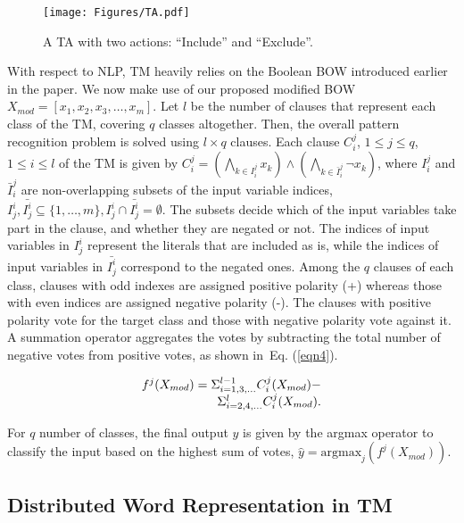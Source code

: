 \documentclass[11pt]{article}
\begin{document}
\begin{figure}[h]
    \centering
    \texttt{[image: Figures/TA.pdf]}
    \caption{A TA with two actions: ``Include'' and ``Exclude''.}
    \label{fig4}
\end{figure}


\par With respect to NLP, TM heavily relies on the Boolean BOW introduced earlier in the paper. We now make use of our proposed modified BOW \(X_{mod} = [x_1, x_2, x_3, \ldots, x_m]\). Let \(l\) be the number of clauses that represent each class of the TM, covering \(q\) classes altogether. Then, the overall pattern recognition problem is solved using \(l \times q\) clauses. Each clause \(C_i^j\), \(1\leq j \leq q\), \(1\leq i \leq l\) of the TM is given by $C_i^j = \left(\bigwedge \limits _{k \in I_i^j}{x_k} \right) \wedge \left(\bigwedge \limits _{k \in \bar I_i^j}{\neg x_k} \right)$, 
where \(I_i^j\) and \(\bar I_i^j\) are non-overlapping subsets of the input variable indices, \(I_j^i, \bar{I_j^i} \subseteq \{1, \ldots, m\}, I_j^i \cap \bar{I_j^i} = \emptyset\). The subsets decide which of the input variables take part in the clause, and whether they are negated or not. The indices of input variables in \(I_j^i\) represent the literals that are included as is, while the indices of input variables in \(\bar{I_j^i}\) correspond to the negated ones. Among the \(q\) clauses of each class, clauses with odd indexes are assigned positive polarity (+) whereas those with even indices are assigned negative polarity (-). The clauses with positive polarity vote for the target class and those with negative polarity vote against it. A summation operator aggregates the votes by subtracting the total number of negative votes from positive votes, as shown in~Eq. (\ref{eqn4}). 

{\small
\begin{equation}\label{eqn4}
\begin{tabular}{r}
    $f^j(X_{mod}) =\Sigma_{i=1,3,\ldots}^{l-1}C^j_i{(X_{mod})}-$ \\
    $\Sigma_{i=2,4,\ldots}^{l}C^j_i{(X_{mod})}$.
\end{tabular}
\end{equation}}

 For \(q\) number of classes, the final output \(y\) is given by the argmax operator to classify the input based on the highest sum of votes, $\hat{y} =\mathrm{argmax}_{j}\left( f^j(X_{mod}) \right)$. 

\subsection{Distributed Word Representation in TM}
\end{document}
